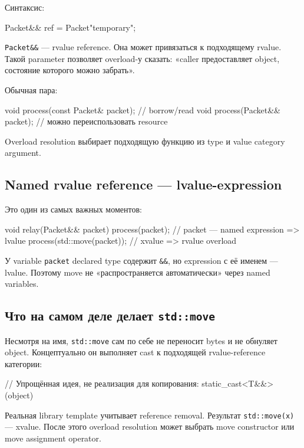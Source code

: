 Синтаксис:

\begin{cppcode}
Packet&& ref = Packet{"temporary"};
\end{cppcode}

\texttt{Packet\&\&} --- rvalue reference. Она может привязаться к подходящему
rvalue. Такой parameter позволяет overload-у сказать:
«caller предоставляет object, состояние которого можно забрать».

Обычная пара:

\begin{cppcode}
void process(const Packet& packet); // borrow/read
void process(Packet&& packet);      // можно переиспользовать resource
\end{cppcode}

Overload resolution выбирает подходящую функцию из type и value category
argument.

\subsection{Named rvalue reference --- lvalue-expression}

Это один из самых важных моментов:

\begin{cppcode}
void relay(Packet&& packet) {
    process(packet);            // packet --- named expression => lvalue
    process(std::move(packet)); // xvalue => rvalue overload
}
\end{cppcode}

У variable \texttt{packet} declared type содержит \texttt{\&\&}, но expression
с её именем --- lvalue. Поэтому move не «распространяется автоматически»
через named variables.

\subsection{Что на самом деле делает \texttt{std::move}}

Несмотря на имя, \texttt{std::move} сам по себе не переносит bytes и не
обнуляет object. Концептуально он выполняет cast к подходящей rvalue-reference
категории:

\begin{cppcode}
// Упрощённая идея, не реализация для копирования:
static_cast<T&&>(object)
\end{cppcode}

Реальная library template учитывает reference removal. Результат
\texttt{std::move(x)} --- xvalue. После этого overload resolution может выбрать
move constructor или move assignment operator.

